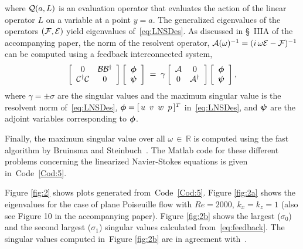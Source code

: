 \documentclass[%
secnumarabic,%
 amssymb, amsmath,%
 aps,prf,superscriptaddress,longbibliography
frontmatterverbose,
]{revtex4-2}
\newcommand{\bphi}{\mbox{\boldmath$\phi$}}
\newcommand{\bpsi}{\mbox{\boldmath$\psi$}}
\newcommand{\fref}[1]{Figure \ref{#1}}
\begin{document}
where $\mathcal{Q}(a,L)$ is an evaluation operator that evaluates the action of the linear operator $L$ on a variable at a point $y = a$.
The generalized eigenvalues of the operators $(\mathcal{F},\mathcal{E})$ yield eigenvalues of~\eqref{eq:LNSDes}. As discussed in \S~IIIA of the accompanying paper, the norm of the resolvent operator, $\mathcal{A}(\omega)^{-1} = (i\,\omega \mathcal{E} - \mathcal{F})^{-1}$ can be computed using a feedback interconnected system, 
\begin{align}\label{eq:feedback}
  \left[
\begin{array}{cc}
  0 &\MM{B}\MM{B}^{\dagger} \\
   \MM{C}^{\dagger}\MM{C}&0
\end{array} \right] \left[ \begin{array}{c}
  \bphi \\
  \bpsi
\end{array} \right]
\;=\;
\gamma \left[\begin{array}{cc}
  \MM{A} & 0\\
  0 & \MM{A}^{\dagger}
\end{array}\right]
\left[ \begin{array}{c}
  \bphi \\
  \bpsi
\end{array} \right],
\end{align}
where $\gamma = \pm \sigma$ are the singular values and the maximum singular value is the resolvent norm of~\eqref{eq:LNSDes},  $\bphi = [\,u~\, v~\, w~\, p\,]^T$ in~\eqref{eq:LNSDes}, and $\bpsi$ are the adjoint variables corresponding to $\bphi$.

Finally, the maximum singular value over all $\omega\,\in\, \mathbb{R}$ is computed using the fast algorithm by Bruinsma and Steinbuch~\cite{BRUINSMA1990287}. The {\sf Matlab} code for these different problems concerning the linearized Navier-Stokes equations is given in~Code~\ref{Cod:5}. 

\fref{fig:2} shows plots generated from~Code~\ref{Cod:5}. \fref{fig:2a} shows the eigenvalues for the case of plane Poiseuille flow with $Re = 2000$, $k_x = k_z = 1$ (also see Figure 10 in the accompanying paper). \fref{fig:2b} shows the largest ($\sigma_0$) and the second largest ($\sigma_1$) singular values calculated from~\eqref{eq:feedback}. The singular values computed in~\fref{fig:2b} are in agreement with~\cite[Figure 4.10]{schmid2012stability}.
\end{document}
